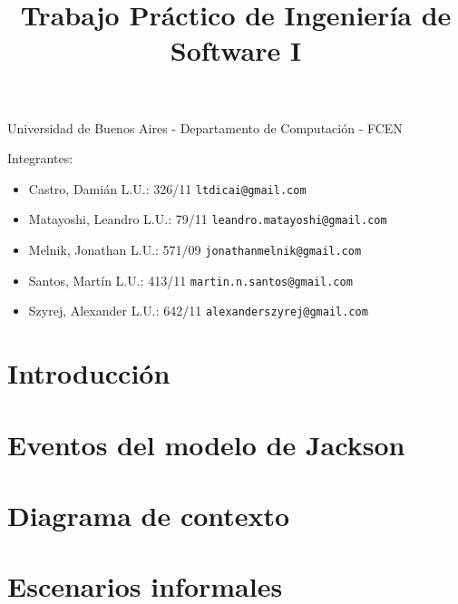 \documentclass[a4paper,11pt]{article}
\title{Trabajo Práctico de Ingeniería de Software I}
\begin{document}
\maketitle

\begin{center}
	Universidad de Buenos Aires - Departamento de Computaci\'on - FCEN
\end{center}

\vspace{2cm}
Integrantes:

\begin{itemize}
	\item Castro, Dami\'an L.U.: 326/11  \verb+ltdicai@gmail.com+
	\item Matayoshi, Leandro L.U.: 79/11 \verb+leandro.matayoshi@gmail.com+
	\item Melnik, Jonathan L.U.: 571/09 \verb+jonathanmelnik@gmail.com+
	\item Santos, Martín L.U.: 413/11 \verb+martin.n.santos@gmail.com+
	\item Szyrej, Alexander L.U.: 642/11   \verb+alexanderszyrej@gmail.com+
	
\end{itemize}

\newpage

\tableofcontents

\newpage

\section{Introducción}



\newpage

\section{Eventos del modelo de Jackson}



\newpage
\section{Diagrama de contexto}


\section{Escenarios informales}



\end{document}
